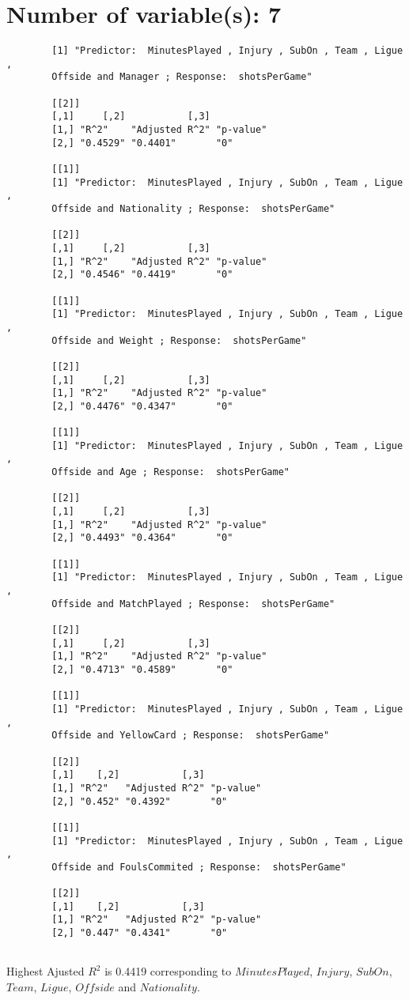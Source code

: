 \documentclass[12pt]{article}
\begin{document}
	\section{Number of variable(s): 7}
	\begin{verbatim}
		[1] "Predictor:  MinutesPlayed , Injury , SubOn , Team , Ligue , 
		Offside and Manager ; Response:  shotsPerGame"
		
		[[2]]
		[,1]     [,2]           [,3]     
		[1,] "R^2"    "Adjusted R^2" "p-value"
		[2,] "0.4529" "0.4401"       "0"      
		
		[[1]]
		[1] "Predictor:  MinutesPlayed , Injury , SubOn , Team , Ligue , 
		Offside and Nationality ; Response:  shotsPerGame"
		
		[[2]]
		[,1]     [,2]           [,3]     
		[1,] "R^2"    "Adjusted R^2" "p-value"
		[2,] "0.4546" "0.4419"       "0"      
		
		[[1]]
		[1] "Predictor:  MinutesPlayed , Injury , SubOn , Team , Ligue , 
		Offside and Weight ; Response:  shotsPerGame"
		
		[[2]]
		[,1]     [,2]           [,3]     
		[1,] "R^2"    "Adjusted R^2" "p-value"
		[2,] "0.4476" "0.4347"       "0"      
		
		[[1]]
		[1] "Predictor:  MinutesPlayed , Injury , SubOn , Team , Ligue , 
		Offside and Age ; Response:  shotsPerGame"
		
		[[2]]
		[,1]     [,2]           [,3]     
		[1,] "R^2"    "Adjusted R^2" "p-value"
		[2,] "0.4493" "0.4364"       "0"      
		
		[[1]]
		[1] "Predictor:  MinutesPlayed , Injury , SubOn , Team , Ligue , 
		Offside and MatchPlayed ; Response:  shotsPerGame"
		
		[[2]]
		[,1]     [,2]           [,3]     
		[1,] "R^2"    "Adjusted R^2" "p-value"
		[2,] "0.4713" "0.4589"       "0"      
		
		[[1]]
		[1] "Predictor:  MinutesPlayed , Injury , SubOn , Team , Ligue , 
		Offside and YellowCard ; Response:  shotsPerGame"
		
		[[2]]
		[,1]    [,2]           [,3]     
		[1,] "R^2"   "Adjusted R^2" "p-value"
		[2,] "0.452" "0.4392"       "0"      
		
		[[1]]
		[1] "Predictor:  MinutesPlayed , Injury , SubOn , Team , Ligue , 
		Offside and FoulsCommited ; Response:  shotsPerGame"
		
		[[2]]
		[,1]    [,2]           [,3]     
		[1,] "R^2"   "Adjusted R^2" "p-value"
		[2,] "0.447" "0.4341"       "0"      
		
	\end{verbatim}
		Highest Ajusted $ R^2 $ is 0.4419 corresponding to $ MinutesPlayed $, $ Injury $, $ SubOn $, $ Team $, $ Ligue $, $ Offside $ and $ Nationality $.
	
\end{document}
